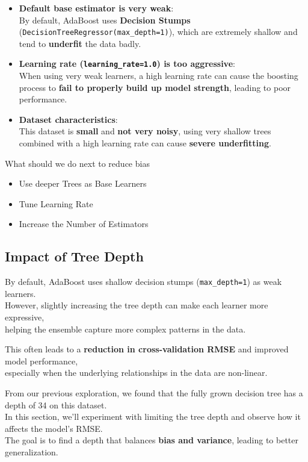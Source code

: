 \documentclass[
  letterpaper,
  DIV=11,
  numbers=noendperiod]{scrreprt}
\providecommand{\tightlist}{%
  \setlength{\itemsep}{0pt}\setlength{\parskip}{0pt}}\usepackage{longtable,booktabs,array}
\begin{document}
\begin{itemize}
\item
  \textbf{Default base estimator is very weak}:\\
  By default, AdaBoost uses \textbf{Decision Stumps}
  (\texttt{DecisionTreeRegressor(max\_depth=1)}), which are extremely
  shallow and tend to \textbf{underfit} the data badly.
\item
  \textbf{Learning rate (\texttt{learning\_rate=1.0}) is too
  aggressive}:\\
  When using very weak learners, a high learning rate can cause the
  boosting process to \textbf{fail to properly build up model strength},
  leading to poor performance.
\item
  \textbf{Dataset characteristics}:\\
  This dataset is \textbf{small} and \textbf{not very noisy}, using very
  shallow trees combined with a high learning rate can cause
  \textbf{severe underfitting}.
\end{itemize}

What should we do next to reduce bias

\begin{itemize}
\tightlist
\item
  Use deeper Trees as Base Learners
\item
  Tune Learning Rate
\item
  Increase the Number of Estimators
\end{itemize}

\subsection{Impact of Tree Depth}\label{impact-of-tree-depth}

By default, AdaBoost uses shallow decision stumps
(\texttt{max\_depth=1}) as weak learners.\\
However, slightly increasing the tree depth can make each learner more
expressive,\\
helping the ensemble capture more complex patterns in the data.

This often leads to a \textbf{reduction in cross-validation RMSE} and
improved model performance,\\
especially when the underlying relationships in the data are non-linear.

From our previous exploration, we found that the fully grown decision
tree has a depth of 34 on this dataset.\\
In this section, we'll experiment with limiting the tree depth and
observe how it affects the model's RMSE.\\
The goal is to find a depth that balances \textbf{bias and variance},
leading to better generalization.
\end{document}
